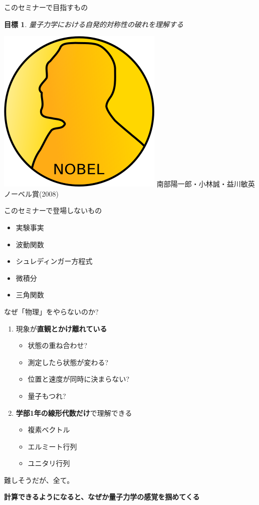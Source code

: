 \documentclass[dvipdfm]{beamer}
\newtheorem*{goal}{目標}
\begin{document}
\begin{frame}{このセミナーで目指すもの}
    \begin{goal}
        量子力学における自発的対称性の破れを理解する
    \end{goal}

    \includegraphics[width=0.1\linewidth]{Nobel_prize_medal.svg.png}
    南部陽一郎・小林誠・益川敏英 ノーベル賞(2008)
\end{frame}

\begin{frame}{このセミナーで登場しないもの}
    \begin{itemize}
        \item 実験事実
        \item 波動関数
        \item シュレディンガー方程式
        \item 微積分
        \item 三角関数
    \end{itemize}
\end{frame}

\begin{frame}{なぜ「物理」をやらないのか?}
    \begin{enumerate}
        \item 現象が\alert{\textbf{直観とかけ離れている}}
        \begin{itemize}
            \item 状態の重ね合わせ?
            \item 測定したら状態が変わる?
            \item 位置と速度が同時に決まらない?
            \item 量子もつれ?
        \end{itemize}
        \item \alert{\textbf{学部1年の線形代数だけ}}で理解できる
        \begin{itemize}
            \item 複素ベクトル
            \item エルミート行列
            \item ユニタリ行列
        \end{itemize}
    \end{enumerate}
    難しそうだが、全て\textbf{}。

    \textbf{計算できるようになると、なぜか量子力学の感覚を掴めてくる}
\end{frame}
\end{document}
